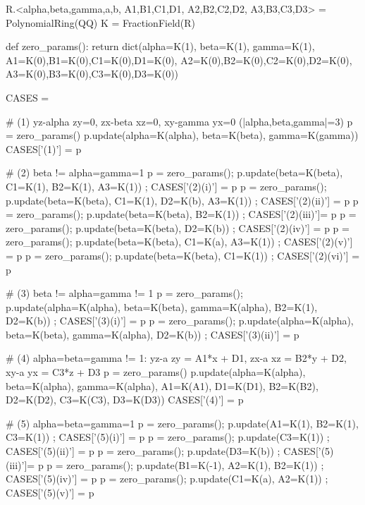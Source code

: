 \documentclass{amsart}
\theoremstyle{definition}
\theoremstyle{remark}
\numberwithin{equation}{section}
\begin{document}
\begin{MyVerbatim}
R.<alpha,beta,gamma,a,b, A1,B1,C1,D1, A2,B2,C2,D2, A3,B3,C3,D3> = PolynomialRing(QQ)
K = FractionField(R)

def zero_params():
    return dict(alpha=K(1), beta=K(1), gamma=K(1),
                A1=K(0),B1=K(0),C1=K(0),D1=K(0),
                A2=K(0),B2=K(0),C2=K(0),D2=K(0),
                A3=K(0),B3=K(0),C3=K(0),D3=K(0))

CASES = {}

# (1) yz-alpha zy=0, zx-beta xz=0, xy-gamma yx=0 (|{alpha,beta,gamma}|=3)
p = zero_params()
p.update(alpha=K(alpha), beta=K(beta), gamma=K(gamma))
CASES['(1)'] = p

# (2) beta != alpha=gamma=1
p = zero_params(); p.update(beta=K(beta), C1=K(1), B2=K(1), A3=K(1))     ; CASES['(2)(i)']  = p
p = zero_params(); p.update(beta=K(beta), C1=K(1), D2=K(b), A3=K(1))     ; CASES['(2)(ii)'] = p
p = zero_params(); p.update(beta=K(beta), B2=K(1))                       ; CASES['(2)(iii)']= p
p = zero_params(); p.update(beta=K(beta), D2=K(b))                       ; CASES['(2)(iv)'] = p
p = zero_params(); p.update(beta=K(beta), C1=K(a), A3=K(1))              ; CASES['(2)(v)']  = p
p = zero_params(); p.update(beta=K(beta), C1=K(1))                       ; CASES['(2)(vi)'] = p

# (3) beta != alpha=gamma != 1
p = zero_params(); p.update(alpha=K(alpha), beta=K(beta), gamma=K(alpha),
                            B2=K(1), D2=K(b))                             ; CASES['(3)(i)']  = p
p = zero_params(); p.update(alpha=K(alpha), beta=K(beta), gamma=K(alpha),
                            D2=K(b))                                      ; CASES['(3)(ii)'] = p

# (4) alpha=beta=gamma != 1: yz-a zy = A1*x + D1, zx-a xz = B2*y + D2, xy-a yx = C3*z + D3
p = zero_params()
p.update(alpha=K(alpha), beta=K(alpha), gamma=K(alpha),
         A1=K(A1), D1=K(D1),  B2=K(B2), D2=K(D2),  C3=K(C3), D3=K(D3))
CASES['(4)'] = p

# (5) alpha=beta=gamma=1
p = zero_params(); p.update(A1=K(1), B2=K(1), C3=K(1))                    ; CASES['(5)(i)']  = p
p = zero_params(); p.update(C3=K(1))                                      ; CASES['(5)(ii)'] = p
p = zero_params(); p.update(D3=K(b))                                      ; CASES['(5)(iii)']= p
p = zero_params(); p.update(B1=K(-1), A2=K(1), B2=K(1))                    ; CASES['(5)(iv)'] = p
p = zero_params(); p.update(C1=K(a), A2=K(1))                              ; CASES['(5)(v)']  = p
\end{MyVerbatim}
\end{document}
